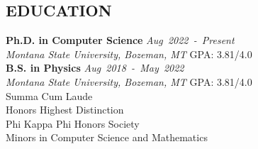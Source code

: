 \documentclass[margin]{res}
\begin{document}
\begin{resume}


\section{EDUCATION}
\raggedright
\textbf{Ph.D. in Computer Science} \hfill \textit{Aug~2022~-~Present}\\
\textit{Montana State University, Bozeman, MT} \hfill GPA: 3.81/4.0\vspace*{1ex}\\
\textbf{B.S. in Physics} \hfill \textit{Aug~2018~-~May~2022}\\
\textit{Montana State University, Bozeman, MT} \hfill GPA: 3.81/4.0\\
	\hspace{3ex} Summa Cum Laude\\
	\hspace{3ex} Honors Highest Distinction\\
	\hspace{3ex} Phi Kappa Phi Honors Society\\
	\hspace{3ex} Minors in Computer Science and Mathematics


%


\end{resume}
\end{document}

